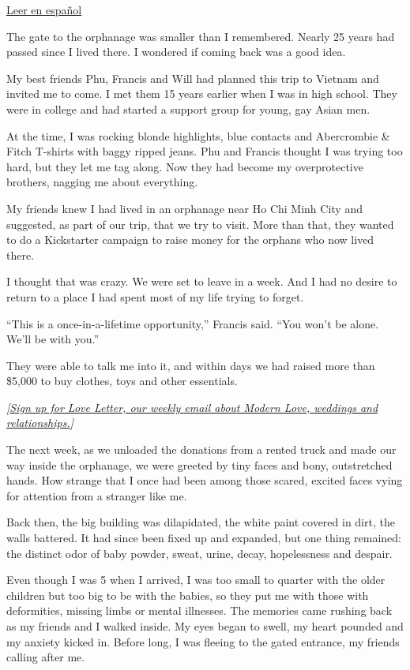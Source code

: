 \href{https://www.nytimes3xbfgragh.onion/es/2020/08/02/espanol/estilos-de-vida/adopcion-orfanato.html}{Leer
en español}

The gate to the orphanage was smaller than I remembered. Nearly 25 years
had passed since I lived there. I wondered if coming back was a good
idea.

My best friends Phu, Francis and Will had planned this trip to Vietnam
and invited me to come. I met them 15 years earlier when I was in high
school. They were in college and had started a support group for young,
gay Asian men.

At the time, I was rocking blonde highlights, blue contacts and
Abercrombie \& Fitch T-shirts with baggy ripped jeans. Phu and Francis
thought I was trying too hard, but they let me tag along. Now they had
become my overprotective brothers, nagging me about everything.

My friends knew I had lived in an orphanage near Ho Chi Minh City and
suggested, as part of our trip, that we try to visit. More than that,
they wanted to do a Kickstarter campaign to raise money for the orphans
who now lived there.

I thought that was crazy. We were set to leave in a week. And I had no
desire to return to a place I had spent most of my life trying to
forget.

``This is a once-in-a-lifetime opportunity,'' Francis said. ``You won't
be alone. We'll be with you.''

They were able to talk me into it, and within days we had raised more
than \$5,000 to buy clothes, toys and other essentials.

\emph{{[}}\href{https://www.nytimes3xbfgragh.onion/newsletters/love-letter}{\emph{Sign
up for Love Letter, our weekly email about Modern Love, weddings and
relationships.}}\emph{{]}}

The next week, as we unloaded the donations from a rented truck and made
our way inside the orphanage, we were greeted by tiny faces and bony,
outstretched hands. How strange that I once had been among those scared,
excited faces vying for attention from a stranger like me.

Back then, the big building was dilapidated, the white paint covered in
dirt, the walls battered. It had since been fixed up and expanded, but
one thing remained: the distinct odor of baby powder, sweat, urine,
decay, hopelessness and despair.

Even though I was 5 when I arrived, I was too small to quarter with the
older children but too big to be with the babies, so they put me with
those with deformities, missing limbs or mental illnesses. The memories
came rushing back as my friends and I walked inside. My eyes began to
swell, my heart pounded and my anxiety kicked in. Before long, I was
fleeing to the gated entrance, my friends calling after me.

